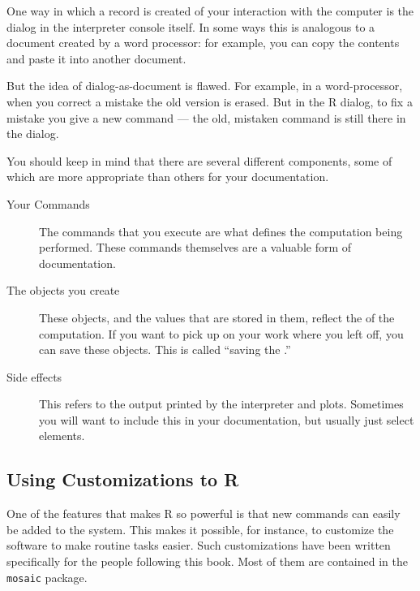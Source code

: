 One way in which a record is created of your interaction with the
computer is the dialog in the interpreter console itself.  In some
ways this is analogous to a document created by a word processor: for
example, you can copy the contents and paste it into another document.

But the idea of dialog-as-document is flawed.  For example, in a
word-processor, when you correct a mistake the old version is erased.
But in the R dialog, to fix a mistake you give a new command --- the
old, mistaken command is still there in the dialog.


You should keep in mind that there are several different components,
some of which are more appropriate than others for your documentation.

\begin{description}
\item[Your Commands]  The commands that you execute are what defines
  the computation being performed.  These commands themselves are a
  valuable form of documentation. 

\item[The objects you create] These objects, and the values that are
  stored in them, reflect the  of the computation.  If
  you want to pick up on your work where you left off, you can save
  these objects.  This is called ``saving the .''

\item[Side effects]  This refers to the output printed by the
  interpreter and plots.  Sometimes you will want to include this in your
  documentation, but usually just select elements.
\end{description}

\subsection{Using Customizations to R}

\label{sec:R-customizations}


One of the features that makes R so powerful is that new commands can easily be
added to the system.  This makes it possible, for instance, to
customize the software to make routine tasks easier.  Such
customizations have been written specifically for the people following
this book.  Most of them are contained in the \texttt{mosaic}
package. 


